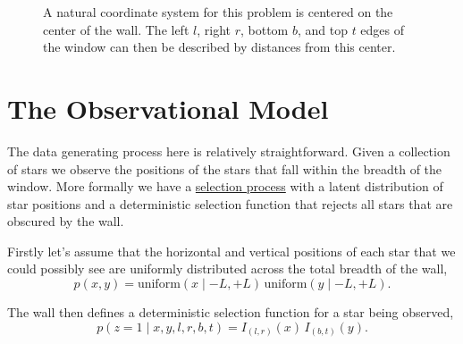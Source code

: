 \documentclass[
  letterpaper,
  DIV=11,
  numbers=noendperiod]{scrartcl}
\begin{document}
\begin{figure}


\caption{\label{fig-coordinate-system}A natural coordinate system for
this problem is centered on the center of the wall. The left \(l\),
right \(r\), bottom \(b\), and top \(t\) edges of the window can then be
described by distances from this center.}

\end{figure}%

\section{The Observational Model}\label{the-observational-model}

The data generating process here is relatively straightforward. Given a
collection of stars we observe the positions of the stars that fall
within the breadth of the window. More formally we have a
\href{https://betanalpha.github.io/assets/chapters_html/modeling_selection.html}{selection
process} with a latent distribution of star positions and a
deterministic selection function that rejects all stars that are
obscured by the wall.

Firstly let's assume that the horizontal and vertical positions of each
star that we could possibly see are uniformly distributed across the
total breadth of the wall, \[
p(x, y) = \text{uniform}(x \mid -L, +L) \, \text{uniform}(y \mid -L, +L).
\]

The wall then defines a deterministic selection function for a star
being observed, \[
p(z = 1 \mid x, y, l, r, b, t) = I_{(l, r)}(x) \, I_{(b, t)}(y).
\]
\end{document}
